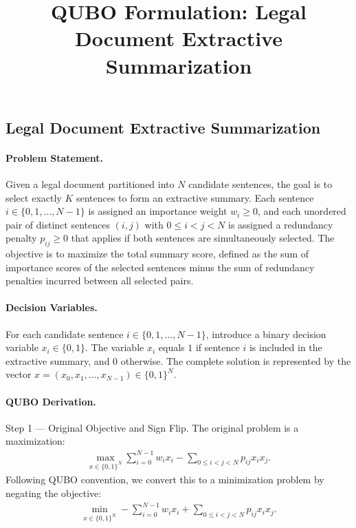 \documentclass[12pt]{article}
\title{QUBO Formulation: Legal Document Extractive Summarization}
\date{}
\begin{document}
\maketitle

\subsection*{Legal Document Extractive Summarization}

\paragraph{Problem Statement.}
Given a legal document partitioned into $N$ candidate sentences, the goal is to select exactly $K$ sentences to form an extractive summary. Each sentence $i \in \{0, 1, \dots, N-1\}$ is assigned an importance weight $w_i \geq 0$, and each unordered pair of distinct sentences $(i,j)$ with $0 \leq i < j < N$ is assigned a redundancy penalty $p_{ij} \geq 0$ that applies if both sentences are simultaneously selected. The objective is to maximize the total summary score, defined as the sum of importance scores of the selected sentences minus the sum of redundancy penalties incurred between all selected pairs.

\paragraph{Decision Variables.}
For each candidate sentence $i \in \{0, 1, \dots, N-1\}$, introduce a binary decision variable $x_i \in \{0, 1\}$. The variable $x_i$ equals $1$ if sentence $i$ is included in the extractive summary, and $0$ otherwise. The complete solution is represented by the vector $x = (x_0, x_1, \dots, x_{N-1}) \in \{0, 1\}^N$.

\paragraph{QUBO Derivation.}
Step 1 --- Original Objective and Sign Flip.
The original problem is a maximization:
\begin{align}
\max_{x \in \{0,1\}^N} \sum_{i=0}^{N-1} w_i x_i - \sum_{0 \leq i < j < N} p_{ij} x_i x_j.
\end{align}
Following QUBO convention, we convert this to a minimization problem by negating the objective:
\begin{align}
\min_{x \in \{0,1\}^N} -\sum_{i=0}^{N-1} w_i x_i + \sum_{0 \leq i < j < N} p_{ij} x_i x_j.
\end{align}
\end{document}
